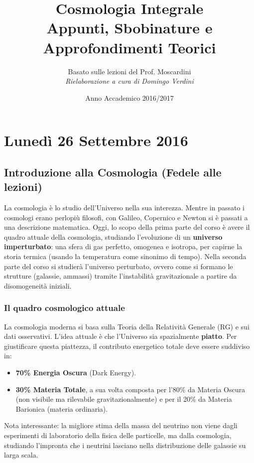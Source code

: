 \documentclass[11pt,a4paper]{report}
\title{\textbf{Cosmologia Integrale}\\ \Large Appunti, Sbobinature e Approfondimenti Teorici}
\author{Basato sulle lezioni del Prof. Moscardini\\ \textit{Rielaborazione a cura di Domingo Verdini}}
\date{Anno Accademico 2016/2017}
\begin{document}
\maketitle

\tableofcontents
\newpage

\chapter{Lunedì 26 Settembre 2016}

\section{Introduzione alla Cosmologia (Fedele alle lezioni)}
La cosmologia è lo studio dell'Universo nella sua interezza. Mentre in passato i cosmologi erano perlopiù filosofi, con Galileo, Copernico e Newton si è passati a una descrizione matematica.
Oggi, lo scopo della prima parte del corso è avere il quadro attuale della cosmologia, studiando l'evoluzione di un \textbf{universo imperturbato}: una sfera di gas perfetto, omogenea e isotropa, per capirne la storia termica (usando la temperatura come sinonimo di tempo). Nella seconda parte del corso si studierà l'universo perturbato, ovvero come si formano le strutture (galassie, ammassi) tramite l'instabilità gravitazionale a partire da disomogeneità iniziali.

\subsection{Il quadro cosmologico attuale}
La cosmologia moderna si basa sulla Teoria della Relatività Generale (RG) e sui dati osservativi. L'idea attuale è che l'Universo sia spazialmente \textbf{piatto}. Per giustificare questa piattezza, il contributo energetico totale deve essere suddiviso in:
\begin{itemize}
    \item \textbf{70\% Energia Oscura} (Dark Energy).
    \item \textbf{30\% Materia Totale}, a sua volta composta per l'80\% da Materia Oscura (non visibile ma rilevabile gravitazionalmente) e per il 20\% da Materia Barionica (materia ordinaria).
\end{itemize}
Nota interessante: la migliore stima della massa del neutrino non viene dagli esperimenti di laboratorio della fisica delle particelle, ma dalla cosmologia, studiando l'impronta che i neutrini lasciano nella distribuzione delle galassie su larga scala.
\end{document}
